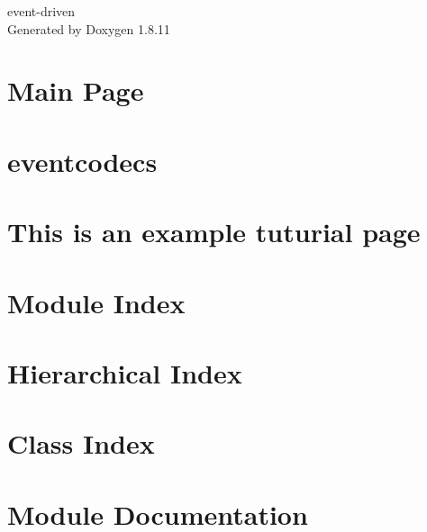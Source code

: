 \documentclass[twoside]{book}
\newcommand{\+}{\discretionary{\mbox{\scriptsize$\hookleftarrow$}}{}{}}
\newcommand{\clearemptydoublepage}{%
  \newpage{\pagestyle{empty}\cleardoublepage}%
}
\begin{document}
\hypersetup{pageanchor=false,
             bookmarksnumbered=true,
             pdfencoding=unicode
            }
\begin{titlepage}
\vspace*{7cm}
\begin{center}%
{\Large event-\/driven }\\
\vspace*{1cm}
{\large Generated by Doxygen 1.8.11}\\
\end{center}
\end{titlepage}
\clearemptydoublepage
\tableofcontents
\clearemptydoublepage
{}
\hypersetup{pageanchor=true}

\chapter{Main Page}
\label{index}\hypertarget{index}{}
\chapter{eventcodecs}
\label{md__home_aglover_workspace_projects_event-driven_documentation_eventcodecs}
\hypertarget{md__home_aglover_workspace_projects_event-driven_documentation_eventcodecs}{}

\chapter{This is an example tuturial page}
\label{md__home_aglover_workspace_projects_event-driven_documentation_tutorial}
\hypertarget{md__home_aglover_workspace_projects_event-driven_documentation_tutorial}{}

\chapter{Module Index}

\chapter{Hierarchical Index}

\chapter{Class Index}

\chapter{Module Documentation}
















\end{document}
